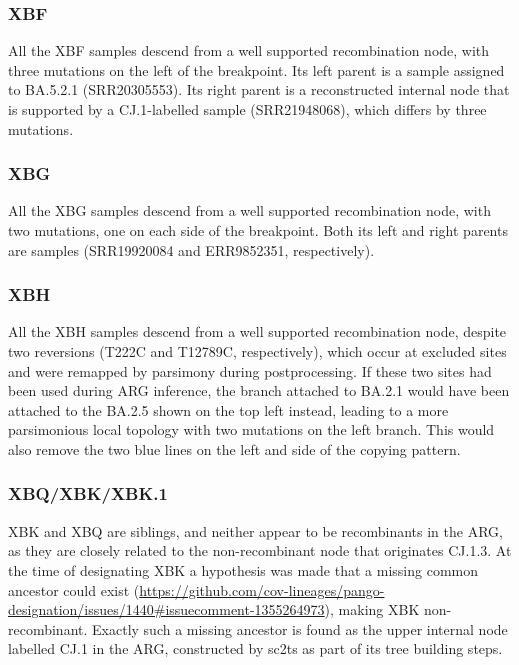 \documentclass[12pt]{article}
\begin{document}

\subsubsection{XBF}
\label{sec:dd_xbf}

All the XBF samples descend from a well supported recombination node,
with three mutations on the left of the breakpoint.
Its left parent is a sample assigned to BA.5.2.1 (SRR20305553).
Its right parent is a reconstructed internal node
that is supported by a CJ.1-labelled sample (SRR21948068),
which differs by three mutations.

\subsubsection{XBG}
\label{sec:dd_xbg}

All the XBG samples descend from a well supported recombination node,
with two mutations, one on each side of the breakpoint.
Both its left and right parents are samples
(SRR19920084 and ERR9852351, respectively).

\subsubsection{XBH}
\label{sec:dd_xbh}
All the XBH samples descend from a well supported recombination node,
despite two reversions (T222C and T12789C, respectively),
which occur at excluded sites and
were remapped by parsimony during postprocessing.
If these two sites had been used during ARG inference,
the branch attached to BA.2.1 would have been attached to
the BA.2.5 shown on the top left instead,
leading to a more parsimonious local topology
with two mutations on the left branch. This would also remove the two
blue lines on the left and side of the copying pattern.

\subsubsection{XBQ/XBK/XBK.1}
\label{sec:dd_xbq}

XBK and XBQ are siblings, and neither appear to be recombinants in the ARG,
as they are closely related to the non-recombinant node that originates CJ.1.3.
At the time of designating XBK
a hypothesis was made that a missing common ancestor could exist
(\url{https://github.com/cov-lineages/pango-designation/issues/1440\#issuecomment-1355264973}),
making XBK non-recombinant.
Exactly such a missing ancestor
is found as the upper internal node labelled CJ.1 in the ARG,
constructed by sc2ts as part of its tree building steps.
\end{document}

